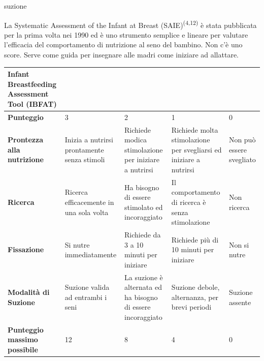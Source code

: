 \documentclass[]{article}
\begin{document}
suzione

La Systematic Assessment of the Infant at Breast
(SAIE)\textsuperscript{(4,12)} è stata pubblicata per la prima volta nei
1990 ed è uno strumento semplice e lineare per valutare l'efficacia del
comportamento di nutrizione al seno del bambino. Non c'è uno score.
Serve come guida per insegnare alle madri come iniziare ad allattare.

\begin{longtable}[]{@{}lllll@{}}
\toprule
\textbf{Infant Breastfeeding Assessment Tool (IBFAT)} & & &
&\tabularnewline
\midrule
\endhead
\textbf{Punteggio} & 3 & 2 & 1 & 0\tabularnewline
\textbf{Prontezza alla nutrizione} & Inizia a nutrirsi prontamente senza
stimoli & Richiede modica stimolazione per iniziare a nutrirsi &
Richiede molta stimolazione per svegliarsi ed iniziare a nutrirsi & Non
può essere svegliato\tabularnewline
\textbf{Ricerca} & Ricerca efficacemente in una sola volta & Ha bisogno
di essere stimolato ed incoraggiato & Il comportamento di ricerca è
senza stimolazione & Non ricerca\tabularnewline
\textbf{Fissazione} & Si nutre immediatamente & Richiede da 3 a 10
minuti per iniziare & Richiede più di 10 minuti per iniziare & Non si
nutre\tabularnewline
\textbf{Modalità di Suzione} & Suzione valida ad entrambi i seni & La
suzione è alternata ed ha bisogno di essere incoraggiato & Suzione
debole, alternanza, per brevi periodi & Suzione assente\tabularnewline
\textbf{Punteggio massimo possibile} & 12 & 8 & 4 & 0\tabularnewline
\bottomrule
\end{longtable}
\end{document}
